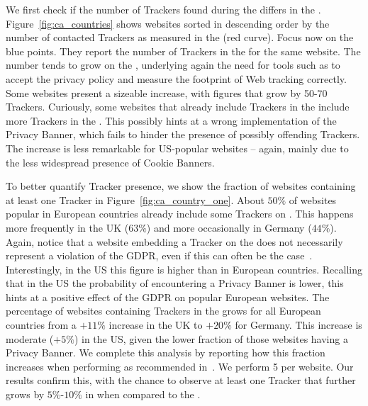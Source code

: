 We first check if the number of Trackers found during the \BEFORE  differs in the \AFTER. Figure~\ref{fig:ca_countries} shows websites sorted in descending order by the number of contacted Trackers as measured in the \BEFORE (red curve). Focus now on the blue points. They report the number of Trackers in the \AFTER for the same website. The number tends to grow on the \AFTER, underlying again the need for tools such as \TOOL to accept the privacy policy and measure the footprint of Web tracking correctly. Some websites present a sizeable increase, with figures that grow by 50-70 Trackers. Curiously, some websites that already include Trackers in the \BEFORE include more Trackers in the \AFTER. This possibly hints at a wrong implementation of the Privacy Banner, which fails to hinder the presence of possibly offending Trackers. The increase is less remarkable for US-popular websites -- again, mainly due to the less widespread presence of Cookie Banners.

To better quantify Tracker presence, we show the fraction of websites containing at least one Tracker in Figure~\ref{fig:ca_country_one}. About $50\%$ of websites popular in European countries already include some Trackers on \BEFORE. This happens more frequently in the UK ($63\%$) and more occasionally in Germany ($44\%$). Again, notice that a website embedding a Tracker on the \BEFORE does not necessarily represent a violation of the GDPR, even if this can often be the case~\cite{trevisan20194}. Interestingly, in the US this figure is higher than in European countries. Recalling that in the US the probability of encountering a Privacy Banner is lower, this hints at a positive effect of the GDPR on popular European websites. The percentage of websites containing Trackers in the \AFTER grows for all European countries from a $+11\%$ increase in the UK to $+20\%$ for Germany. This increase is moderate ($+5\%$) in the US, given the lower fraction of those websites having a Privacy Banner. We complete this analysis by reporting how this fraction increases when performing \INTERNAL as recommended in~\cite{aqeel2020on}. We perform 5 \INTERNAL per website. Our results confirm this, with the chance to observe at least one Tracker that further grows by $5\%$-$10\%$ in \INTERNAL when compared to the \AFTER.

